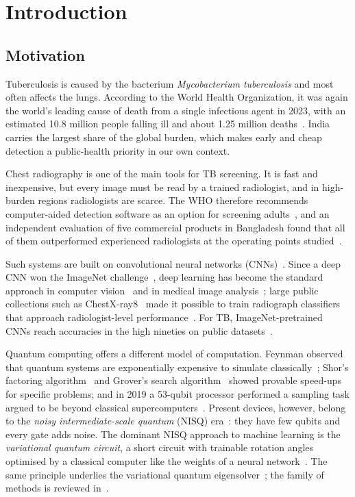 \chapter{Introduction}
\label{ch:intro}

\section{Motivation}
Tuberculosis is caused by the bacterium \emph{Mycobacterium tuberculosis}
and most often affects the lungs. According to the World Health
Organization, it was again the world's leading cause of death from a single
infectious agent in 2023, with an estimated 10.8 million people falling ill
and about 1.25 million deaths~\cite{who2024}. India carries the largest
share of the global burden, which makes early and cheap detection a
public-health priority in our own context.

Chest radiography is one of the main tools for TB screening. It is fast and
inexpensive, but every image must be read by a trained radiologist, and in
high-burden regions radiologists are scarce. The WHO therefore recommends
computer-aided detection software as an option for screening
adults~\cite{who2021screening}, and an independent evaluation of five
commercial products in Bangladesh found that all of them outperformed
experienced radiologists at the operating points studied~\cite{qin2021}.

Such systems are built on convolutional neural networks
(CNNs)~\cite{lecun1998}. Since a deep CNN won the ImageNet
challenge~\cite{krizhevsky2012, deng2009}, deep learning has become the
standard approach in computer vision~\cite{lecun2015} and in medical image
analysis~\cite{litjens2017}; large public collections such as
ChestX-ray8~\cite{wang2017} made it possible to train radiograph classifiers
that approach radiologist-level performance~\cite{rajpurkar2017}. For TB,
ImageNet-pretrained CNNs reach accuracies in the high nineties on public
datasets~\cite{rahman2020}.

Quantum computing offers a different model of computation. Feynman observed
that quantum systems are exponentially expensive to simulate
classically~\cite{feynman1982}; Shor's factoring algorithm~\cite{shor1997}
and Grover's search algorithm~\cite{grover1996} showed provable speed-ups
for specific problems; and in 2019 a 53-qubit processor performed a sampling
task argued to be beyond classical supercomputers~\cite{arute2019}. Present
devices, however, belong to the \emph{noisy intermediate-scale quantum}
(NISQ) era~\cite{preskill2018}: they have few qubits and every gate adds
noise. The dominant NISQ approach to machine learning is the
\emph{variational quantum circuit}, a short circuit with trainable rotation
angles optimised by a classical computer like the weights of a neural
network~\cite{schuld2020circuit, mitarai2018, farhi2018, benedetti2019}. The
same principle underlies the variational quantum
eigensolver~\cite{peruzzo2014, kandala2017}; the family of methods is
reviewed in~\cite{cerezo2021vqa, schuld2018book}.

